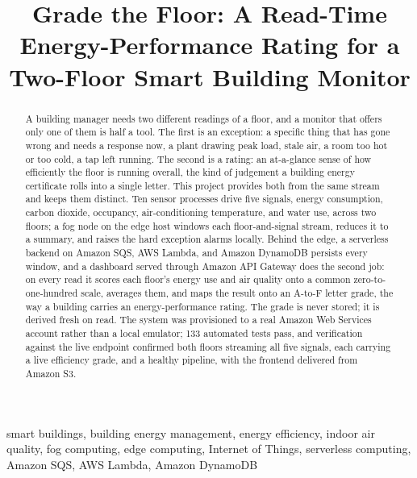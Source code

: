 \documentclass[conference]{IEEEtran}
\begin{document}
\title{Grade the Floor: A Read-Time Energy-Performance Rating for a Two-Floor Smart Building Monitor}

\author{
}

\maketitle

\begin{abstract}
A building manager needs two different readings of a floor, and a monitor that offers only one of them is half a tool. The first is an exception: a specific thing that has gone wrong and needs a response now, a plant drawing peak load, stale air, a room too hot or too cold, a tap left running. The second is a rating: an at-a-glance sense of how efficiently the floor is running overall, the kind of judgement a building energy certificate rolls into a single letter. This project provides both from the same stream and keeps them distinct. Ten sensor processes drive five signals, energy consumption, carbon dioxide, occupancy, air-conditioning temperature, and water use, across two floors; a fog node on the edge host windows each floor-and-signal stream, reduces it to a summary, and raises the hard exception alarms locally. Behind the edge, a serverless backend on Amazon SQS, AWS Lambda, and Amazon DynamoDB persists every window, and a dashboard served through Amazon API Gateway does the second job: on every read it scores each floor's energy use and air quality onto a common zero-to-one-hundred scale, averages them, and maps the result onto an A-to-F letter grade, the way a building carries an energy-performance rating. The grade is never stored; it is derived fresh on read. The system was provisioned to a real Amazon Web Services account rather than a local emulator; 133 automated tests pass, and verification against the live endpoint confirmed both floors streaming all five signals, each carrying a live efficiency grade, and a healthy pipeline, with the frontend delivered from Amazon S3.
\end{abstract}

\begin{IEEEkeywords}
smart buildings, building energy management, energy efficiency, indoor air quality, fog computing, edge computing, Internet of Things, serverless computing, Amazon SQS, AWS Lambda, Amazon DynamoDB
\end{IEEEkeywords}
\end{document}
